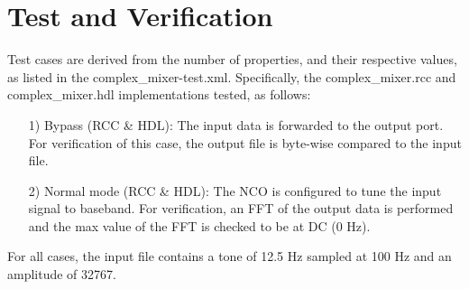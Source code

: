 \documentclass{article}
\def\comp{complex\_mixer}
\begin{document}
\section*{Test and Verification}
Test cases are derived from the number of properties, and their respective values, as listed in the complex\_mixer-test.xml. Specifically, the \comp.rcc and \comp.hdl implementations tested, as follows:
\begin{itemize}
	\item[1)] Bypass (RCC \& HDL): The input data is forwarded to the output port. For verification of this case, the output file is byte-wise compared to the input file.
	\item[2)] Normal mode (RCC \& HDL): The NCO is configured to tune the input signal to baseband. For verification, an FFT of the output data is performed and the max value of the FFT is checked to be at DC (0 Hz).
\end{itemize}
\noindent For all cases, the input file contains a tone of 12.5 Hz sampled at 100 Hz and an amplitude of 32767.\par\medskip
\end{document}
